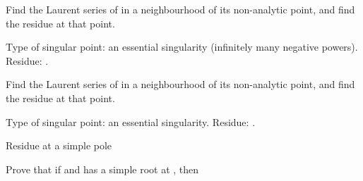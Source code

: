 
\begin{EMexample}{}

Find the Laurent series of  in a neighbourhood of its non-analytic point, and find the residue at that point.

Type of singular point: an essential singularity (infinitely many negative powers). Residue: .

\end{EMexample}

\begin{EMexample}{}

Find the Laurent series of  in a neighbourhood of its non-analytic point, and find the residue at that point.

Type of singular point: an essential singularity. Residue: .

\end{EMexample}

\begin{EMtheorem}{Residue at a simple pole}

Prove that if  and  has a simple root at , then

\end{EMtheorem}

